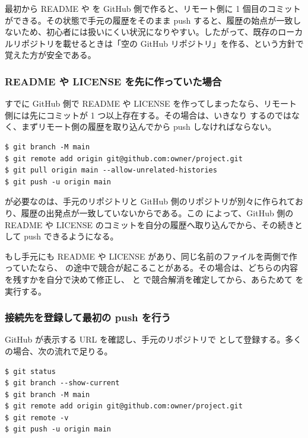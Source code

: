 最初から README や  を GitHub 側で作ると、リモート側に 1 個目のコミットができる。その状態で手元の履歴をそのまま push すると、履歴の始点が一致しないため、初心者には扱いにくい状況になりやすい。したがって、既存のローカルリポジトリを載せるときは「空の GitHub リポジトリ」を作る、という方針で覚えた方が安全である。

\subsubsection{README や LICENSE を先に作っていた場合}

すでに GitHub 側で README や LICENSE を作ってしまったなら、リモート側には先にコミットが 1 つ以上存在する。その場合は、いきなり  するのではなく、まずリモート側の履歴を取り込んでから push しなければならない。

\begin{lstlisting}[numbers=none, xleftmargin=2\zw]
$ git branch -M main
$ git remote add origin git@github.com:owner/project.git
$ git pull origin main --allow-unrelated-histories
$ git push -u origin main
\end{lstlisting}

 が必要なのは、手元のリポジトリと GitHub 側のリポジトリが別々に作られており、履歴の出発点が一致していないからである。この  によって、GitHub 側の README や LICENSE のコミットを自分の履歴へ取り込んでから、その続きとして push できるようになる。

もし手元にも README や LICENSE があり、同じ名前のファイルを両側で作っていたなら、 の途中で競合が起こることがある。その場合は、どちらの内容を残すかを自分で決めて修正し、 と  で競合解消を確定してから、あらためて  を実行する。

\subsubsection{接続先を登録して最初の push を行う}

GitHub が表示する URL を確認し、手元のリポジトリで  として登録する。多くの場合、次の流れで足りる。

\begin{lstlisting}[numbers=none, xleftmargin=2\zw]
$ git status
$ git branch --show-current
$ git branch -M main
$ git remote add origin git@github.com:owner/project.git
$ git remote -v
$ git push -u origin main
\end{lstlisting}

